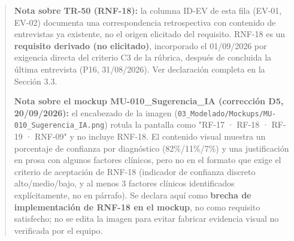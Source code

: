 \documentclass[
]{article}
\begin{document}
\begin{quote}
\textbf{Nota sobre TR-50 (RNF-18):} la columna ID-EV de esta fila
(EV-01, EV-02) documenta una correspondencia retrospectiva con
contenido de entrevistas ya existente, no el origen elicitado del
requisito. RNF-18 es un \textbf{requisito derivado (no elicitado)},
incorporado el 01/09/2026 por exigencia directa del criterio C3 de la
rúbrica, después de concluida la última entrevista (P16, 31/08/2026).
Ver declaración completa en la Sección 3.3.

\textbf{Nota sobre el mockup MU-010\_Sugerencia\_IA (corrección D5,
20/09/2026):} el encabezado de la imagen
(\texttt{03\_Modelado/Mockups/MU-010\_Sugerencia\_IA.png}) rotula la
pantalla como "RF-17 · RF-18 · RF-19 · RNF-09" y no incluye RNF-18. El
contenido visual muestra un porcentaje de confianza por diagnóstico
(82\%/11\%/7\%) y una justificación en prosa con algunos factores
clínicos, pero no en el formato que exige el criterio de aceptación de
RNF-18 (indicador de confianza discreto alto/medio/bajo, y al menos 3
factores clínicos identificados explícitamente, no en párrafo). Se
declara aquí como \textbf{brecha de implementación de RNF-18 en el
mockup}, no como requisito satisfecho; no se edita la imagen para
evitar fabricar evidencia visual no verificada por el equipo.
\end{quote}
\end{document}
